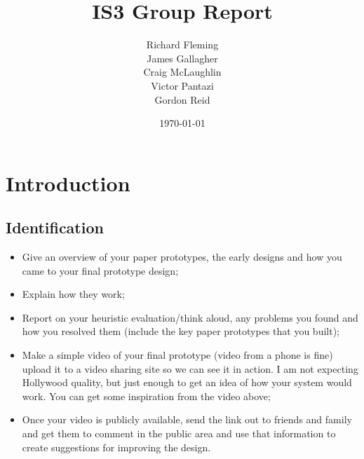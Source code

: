 \documentclass{article}
\title{IS3 Group Report}
\author{
  Richard Fleming \\
  James Gallagher \\
  Craig McLaughlin \\
  Victor Pantazi \\
  Gordon Reid}
\date{\today}
\begin{document}

\maketitle


\section{Introduction}

\subsection{Identification}

\begin{itemize}{}{}
\item Give an overview of your paper prototypes, the early designs and
how you came to your final prototype design;

\item Explain how they work;

\item Report on your heuristic evaluation/think aloud, any problems you
found and how you resolved them (include the key paper prototypes that
you built);

\item Make a simple video of your final prototype (video from a phone
is fine) upload it to a video sharing site so we can see it in action.
I am not expecting Hollywood quality, but just enough to get an idea
of how your system would work. You can get some inspiration from the
video above;

\item Once your video is publicly available, send the link out to
friends and family and get them to comment in the public area and use
that information to create suggestions for improving the design.



\end{itemize}
 

\end{document}
